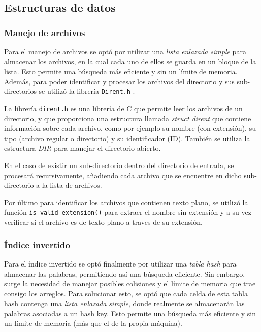 \subsection{Estructuras de datos}

\subsubsection{Manejo de archivos}
Para el manejo de archivos se optó por utilizar una \textit{lista enlazada simple} para almacenar los archivos, en la cual cada uno de ellos se guarda en un bloque de la lista. Esto permite una búsqueda más eficiente y sin un límite de memoria. Además, para poder identificar y procesar los archivos del directorio y sus sub-directorios se utilizó la librería \texttt{Dirent.h} \cite{Dirent.h}.

La librería \texttt{dirent.h} es una librería de C que permite leer los archivos de un directorio, y que proporciona una estructura llamada \textit{struct dirent} que contiene información sobre cada archivo, como por ejemplo su nombre (con extensión), su tipo (archivo regular o directorio) y su identificador (ID). También se utiliza la estructura \textit{DIR} para manejar el directorio abierto.

En el caso de existir un sub-directorio dentro del directorio de entrada, se procesará recursivamente, añadiendo cada archivo que se encuentre en dicho sub-directorio a la lista de archivos.

Por último para identificar los archivos que contienen texto plano, se utilizó la función \texttt{is\_valid\_extension()} para extraer el nombre sin extensión y a su vez verificar si el archivo es de texto plano a traves de su extensión.

\subsubsection{Índice invertido} \label{subsec:ImplIndiceInvertido}
Para el índice invertido se optó finalmente por utilizar una \textit{tabla hash} para almacenar las palabras, permitiendo así una búsqueda eficiente. Sin embargo, surge la necesidad de manejar posibles colisiones y el límite de memoria que trae consigo los arreglos. Para solucionar esto, se optó que cada celda de esta tabla hash contenga una \textit{lista enlazada simple}, donde realmente se almacenarán las palabras asociadas a un hash key. Esto permite una búsqueda más eficiente y sin un límite de memoria (más que el de la propia máquina).


